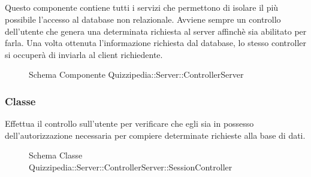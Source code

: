 \subsection{}
Questo componente contiene tutti i servizi che permettono di isolare il più possibile l'accesso al database non relazionale. Avviene sempre un controllo dell'utente che genera una determinata richiesta al server affinchè sia abilitato per farla. 
Una volta ottenuta l'informazione richiesta dal database, lo stesso controller si occuperà di inviarla al client richiedente.
\begin{figure}[H]
\centering
\noindent{}
\caption[Schema Componente Quizzipedia::Server::ControllerServer]{Schema Componente Quizzipedia::Server::ControllerServer}
\end{figure}
\subsubsection{Classe }
Effettua il controllo sull'utente per verificare che egli sia in possesso dell'autorizzazione necessaria per compiere determinate richieste alla base di dati.
\begin{figure}[H]
\centering
\noindent{}
\caption[Schema Classe SessionController]{Schema Classe Quizzipedia::Server::ControllerServer::SessionController}
\end{figure}
